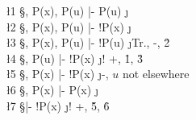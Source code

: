 \documentclass[class=cs245,notes,leqno]{agony}
\begin{document}
\begin{xca}
\end{xca}
\begin{prf}
  \begin{deduce}
    \l1 \S, \X[x]P(x), P(u) |- P(u)       \j {\E}                      \\
    \l2 \S, \X[x]P(x), P(u) |- \A[x]!P(x) \j {\E}                      \\
    \l3 \S, \X[x]P(x), P(u) |- !P(u)      \j {Tr., \A -, \r2}          \\
    \l4 \S, P(u)            |- !\X[x]P(x) \j {! +, \r1, \r3}           \\
    \l5 \S, \X[x]P(x)       |- !\X[x]P(x) \j {\X -, $u$ not elsewhere} \\
    \l6 \S, \X[x]P(x)       |- \X[x]P(x)  \j {\E}                      \\
    \l7 \S                  |- !\X[x]P(x) \j {! +, \r5, \r6}
  \end{deduce}
\end{prf}
\end{document}
